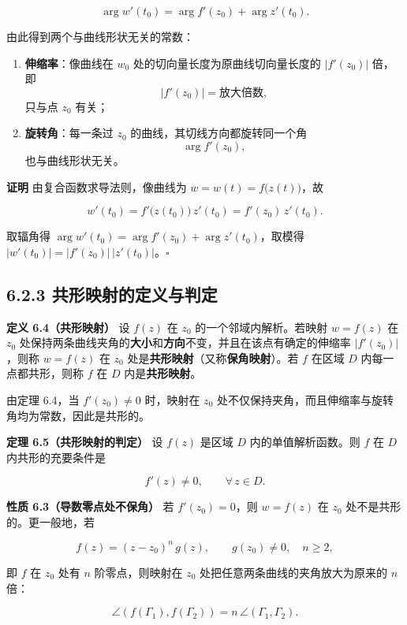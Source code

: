 \[
\arg w'(t_0) = \arg f'(z_0) + \arg z'(t_0).
\]

由此得到两个与曲线形状无关的常数：

\begin{enumerate}
\def\labelenumi{\arabic{enumi}.}
\tightlist
\item
  \textbf{伸缩率}：像曲线在 \(w_0\) 处的切向量长度为原曲线切向量长度的
  \(|f'(z_0)|\) 倍，即 \[
  |f'(z_0)| = \text{放大倍数},
  \] 只与点 \(z_0\) 有关；
\item
  \textbf{旋转角}：每一条过 \(z_0\) 的曲线，其切线方向都旋转同一个角 \[
  \arg f'(z_0),
  \] 也与曲线形状无关。
\end{enumerate}

\textbf{证明} 由复合函数求导法则，像曲线为
\(w=w(t)=f\bigl(z(t)\bigr)\)，故

\[
w'(t_0)=f'\bigl(z(t_0)\bigr)\,z'(t_0)=f'(z_0)\,z'(t_0).
\]

取辐角得 \(\arg w'(t_0)=\arg f'(z_0)+\arg z'(t_0)\)，取模得
\(|w'(t_0)|=|f'(z_0)|\,|z'(t_0)|\)。\(\square\)

\subsection{6.2.3
共形映射的定义与判定}\label{ux5171ux5f62ux6620ux5c04ux7684ux5b9aux4e49ux4e0eux5224ux5b9a}

\textbf{定义 6.4（共形映射）} 设 \(f(z)\) 在 \(z_0\)
的一个邻域内解析。若映射 \(w=f(z)\) 在 \(z_0\)
处保持两条曲线夹角的\textbf{大小}和\textbf{方向}不变，并且在该点有确定的伸缩率
\(|f'(z_0)|\)，则称 \(w=f(z)\) 在 \(z_0\)
处是\textbf{共形映射}（又称\textbf{保角映射}）。若 \(f\) 在区域 \(D\)
内每一点都共形，则称 \(f\) 在 \(D\) 内是\textbf{共形映射}。

由定理 6.4，当 \(f'(z_0)\neq 0\) 时，映射在 \(z_0\)
处不仅保持夹角，而且伸缩率与旋转角均为常数，因此是共形的。

\textbf{定理 6.5（共形映射的判定）} 设 \(f(z)\) 是区域 \(D\)
内的单值解析函数。则 \(f\) 在 \(D\) 内共形的充要条件是

\[
f'(z)\neq 0,\qquad \forall\, z\in D .
\]

\textbf{性质 6.3（导数零点处不保角）} 若 \(f'(z_0)=0\)，则 \(w=f(z)\) 在
\(z_0\) 处不是共形的。更一般地，若

\[
f(z)=(z-z_0)^{n}\,g(z),\qquad g(z_0)\neq 0,\quad n\ge 2,
\]

即 \(f\) 在 \(z_0\) 处有 \(n\) 阶零点，则映射在 \(z_0\)
处把任意两条曲线的夹角放大为原来的 \(n\) 倍：

\[
\angle\left(f(\Gamma_1),f(\Gamma_2)\right)=n\,\angle(\Gamma_1,\Gamma_2).
\]

